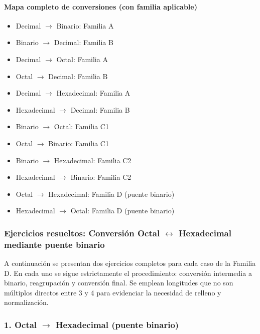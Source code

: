 \documentclass[12pt,twoside]{book}
\begin{document}
						\paragraph{Mapa completo de conversiones (con familia aplicable)}
						\begin{itemize}
							\item Decimal $\rightarrow$ Binario: Familia A
							\item Binario $\rightarrow$ Decimal: Familia B
							\item Decimal $\rightarrow$ Octal: Familia A
							\item Octal $\rightarrow$ Decimal: Familia B
							\item Decimal $\rightarrow$ Hexadecimal: Familia A
							\item Hexadecimal $\rightarrow$ Decimal: Familia B
							\item Binario $\rightarrow$ Octal: Familia C1
							\item Octal $\rightarrow$ Binario: Familia C1
							\item Binario $\rightarrow$ Hexadecimal: Familia C2
							\item Hexadecimal $\rightarrow$ Binario: Familia C2
							\item Octal $\rightarrow$ Hexadecimal: Familia D (puente binario)
							\item Hexadecimal $\rightarrow$ Octal: Familia D (puente binario)
						\end{itemize}
						
						\subsubsection*{Ejercicios resueltos: Conversión Octal $\leftrightarrow$ Hexadecimal mediante puente binario}
						
						\noindent
						A continuación se presentan dos ejercicios completos para cada caso de la Familia D. En cada uno se sigue estrictamente el procedimiento: conversión intermedia a binario, reagrupación y conversión final. Se emplean longitudes que no son múltiplos directos entre 3 y 4 para evidenciar la necesidad de relleno y normalización.
						
						\subsubsection*{1. Octal $\rightarrow$ Hexadecimal (puente binario)}
						
\end{document}
